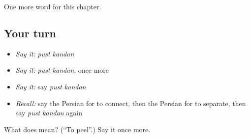 \begin{grammarlens}[title={What you've built}]
One more word for this chapter.
\end{grammarlens}

\subsection*{Your turn}
\begin{itemize}
\raggedright
  \item \emph{Say it:} \emph{pust kandan}
  \item \emph{Say it:} \emph{pust kandan}, once more
  \item \emph{Say it:} say \emph{pust kandan}
  \item \emph{Recall:} say the Persian for to connect, then the Persian for to separate, then say \emph{pust kandan} again
\end{itemize}

\begin{tcolorbox}[breakable,colback=teal!4,colframe=teal!35!black,title={Before you move on}]
What does   mean? (\textquotedblleft{}To peel\textquotedblright{}.) Say it once more.
\end{tcolorbox}
